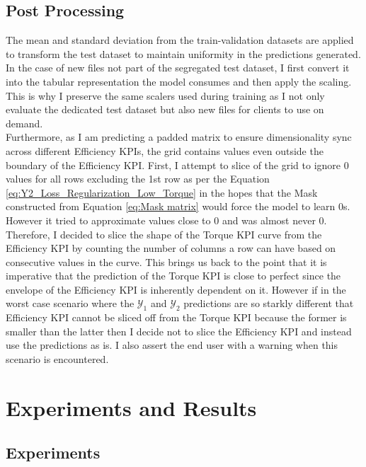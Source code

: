 \documentclass{report} %
\begin{document}
\section{Post Processing}\label{sec:Post Processing}
The mean and standard deviation from the train-validation datasets are applied to transform the test dataset to maintain uniformity in the predictions generated.
In the case of new files not part of the segregated test dataset, I first convert it into the tabular representation the model consumes and then apply the scaling.
This is why I preserve the same scalers used during training as I not only evaluate the dedicated test dataset but also new files for clients to use on demand. \\

Furthermore, as I am predicting a padded matrix to ensure dimensionality sync across different Efficiency \ac{KPI}s, the grid contains values even outside the boundary 
of the Efficiency \ac{KPI}.
First, I attempt to slice of the grid to ignore 0 values for all rows excluding the 1st row as per the Equation \ref{eq:Y2_Loss_Regularization_Low_Torque} in the 
hopes that the Mask constructed from Equation \ref{eq:Mask matrix} would force the model to learn 0s. However it tried to approximate values close to 0 and was almost never 0.\\
Therefore, I decided to slice the shape of the Torque \ac{KPI} curve from the Efficiency \ac{KPI} by counting the number of columns a row can have based on consecutive 
values in the curve.
This brings us back to the point that it is imperative that the prediction of the Torque \ac{KPI} is close to perfect since the envelope of the Efficiency \ac{KPI} is 
inherently dependent on it.
However if in the worst case scenario where the $\mathcal{Y}_1$ and $\mathcal{Y}_2$ predictions are so starkly different that Efficiency \ac{KPI} cannot be sliced off from 
the Torque \ac{KPI} because the former is smaller than the latter then I decide not to slice the Efficiency \ac{KPI} and instead use the predictions as is. I also 
assert the end user with a warning when this scenario is encountered.

\chapter{Experiments and Results}

\section{Experiments}\label{sec:Experiments with MLP}
\end{document}
